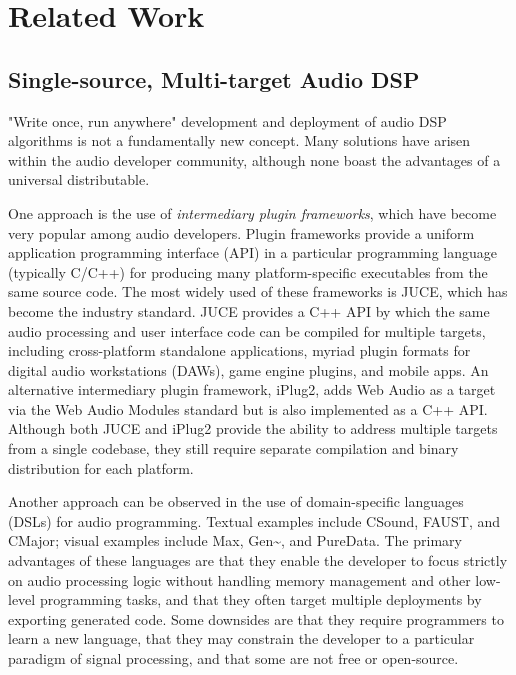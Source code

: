 \chapter{ Related Work }
\label{ssec:Related Work}


\section{ Single-source, Multi-target Audio DSP }
"Write once, run anywhere" development and deployment of audio DSP algorithms is not a fundamentally new concept. Many solutions have arisen within the audio developer community, although none boast the advantages of a universal distributable.


One approach is the use of \textit{intermediary plugin frameworks}, which have become very popular among audio developers\cite{2018_13}. Plugin frameworks provide a uniform application programming interface (API) in a particular programming language (typically C/C++) for producing many platform-specific executables from the same source code. The most widely used of these frameworks is JUCE\cite{JUCE}, which has become the industry standard. JUCE provides a C++ API by which the same audio processing and user interface code can be compiled for multiple targets, including cross-platform standalone applications, myriad plugin formats for digital audio workstations (DAWs), game engine plugins, and mobile apps. An alternative intermediary plugin framework, iPlug2\cite{2018_13}, adds Web Audio as a target via the Web Audio Modules\cite{10.1145/3487553.3524225} standard but is also implemented as a C++ API. Although both JUCE and iPlug2 provide the ability to address multiple targets from a single codebase, they still require separate compilation and binary distribution for each platform.

Another approach can be observed in the use of domain-specific languages (DSLs) for audio programming. Textual examples include CSound\cite{lazzarini2016csound}, FAUST\cite{orlarey:hal-02159014}, and CMajor\cite{huangc}; visual examples include Max\cite{MaxMSP8}, Gen\textasciitilde\cite{wakefield2012real}, and PureData\cite{puckette_puredata_1997}. The primary advantages of these languages are that they enable the developer to focus strictly on audio processing logic without handling memory management and other low-level programming tasks, and that they often target multiple deployments by exporting generated code. Some downsides are that they require programmers to learn a new language, that they may constrain the developer to a particular paradigm of signal processing, and that some are not free or open-source.

